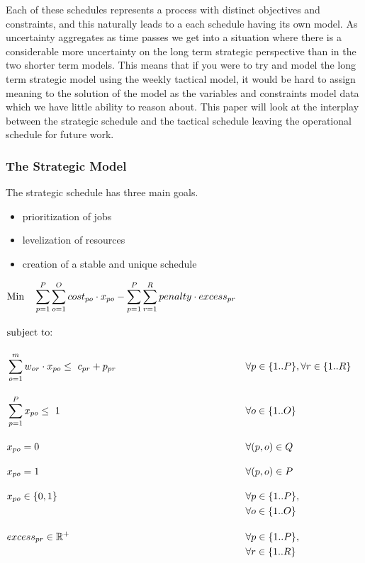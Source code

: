 \documentclass[runningheads]{llncs}
\begin{document}
Each of these schedules represents a process with distinct objectives and constraints, and this naturally leads to a each schedule having its own model. As uncertainty aggregates as time passes we get into a situation where there is a considerable more uncertainty on the long term strategic perspective than in the two shorter term models. This means that if you were to try and model the long term strategic model using the weekly tactical model, it would be hard to assign meaning to the solution of the model as the variables and constraints model data which we have little ability to reason about. This paper will look at the interplay between the strategic schedule and the tactical schedule leaving the operational schedule for future work. 

\subsubsection{The Strategic Model}
The strategic schedule has three main goals.

\begin{itemize}
    \item prioritization of jobs
    \item levelization of resources
    \item creation of a stable and unique schedule
\end{itemize}


\begin{alignat}{2}
    &\text{Min} \quad \sum_{p = 1}^{P} \sum_{o = 1}^{O} cost_{po} \cdot x_{po} - \sum_{p = 1}^{P} \sum_{r = 1}^R penalty \cdot excess_{pr} \label{eqn:objective_function_strategic} \\[1em]
    &\text{subject to:} \notag\\[1em]
    &\sum_{o=1}^m w_{or} \cdot x_{po} \leq \ c_{pr} + p_{pr} \quad  &&\forall p \in \{1..P\}, \forall r \in \{1..R\}\label{eqn:capacity_constraint} \\[1em]
    &\sum_{p = 1}^{P} x_{po} \leq \ 1 \quad                         && \forall o \in \{1..O\}   \label{eqn:single_workorder_constraint}\\[1em]
    &x_{po} = 0                                                     && \forall (p, o) \in Q \quad  \label{eqn:exclusion_constraint} \\[1em]
    &x_{po} = 1                                                     && \forall (p, o) \in P \quad  \label{eqn:inclusion_constraint}\\[1em]
    &x_{po} \in \{0, 1\}                                            && \forall p \in \{1..P\}, \notag \\
    &&& \forall o \in \{1..O\}                 \label{eqn:x_integrality_constraint}\\[1em] 
    &excess_{pr} \in \mathbb{R}^{+}                                      && \forall p \in \{1..P\}, \notag \\
    &&&\forall r \in \{1..R\}                  \label{eqn:p_non_negativity_constraint}
\end{alignat}
\end{document}
